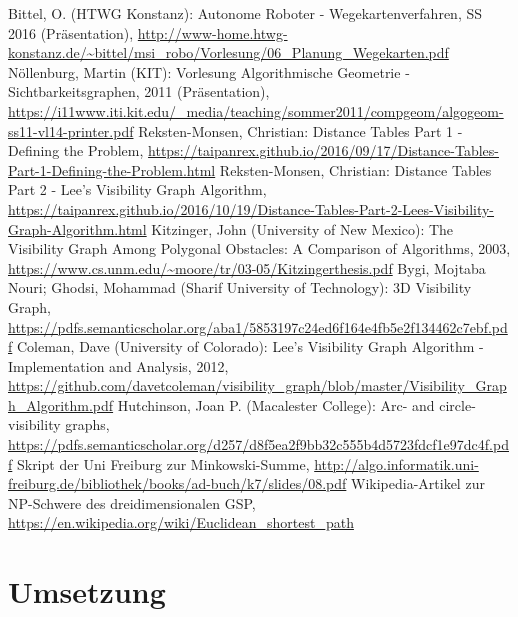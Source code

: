 \documentclass[a4paper, notitlepage, 12pt]{scrartcl}
\begin{document}
\begin{thebibliography}{xx}
 Bittel, O. (HTWG Konstanz): Autonome Roboter - Wegekartenverfahren, SS 2016 (Präsentation), \url{http://www-home.htwg-konstanz.de/~bittel/msi_robo/Vorlesung/06_Planung_Wegekarten.pdf}
 Nöllenburg, Martin (KIT): Vorlesung Algorithmische Geometrie - Sichtbarkeitsgraphen, 2011 (Präsentation), \url{https://i11www.iti.kit.edu/_media/teaching/sommer2011/compgeom/algogeom-ss11-vl14-printer.pdf}
 Reksten-Monsen, Christian: Distance Tables Part 1 - Defining the Problem, \url{https://taipanrex.github.io/2016/09/17/Distance-Tables-Part-1-Defining-the-Problem.html}
 Reksten-Monsen, Christian: Distance Tables Part 2 - Lee's Visibility Graph Algorithm, \url{https://taipanrex.github.io/2016/10/19/Distance-Tables-Part-2-Lees-Visibility-Graph-Algorithm.html}
 Kitzinger, John (University of New Mexico): The Visibility Graph Among Polygonal Obstacles: A Comparison of Algorithms, 2003, \url{https://www.cs.unm.edu/~moore/tr/03-05/Kitzingerthesis.pdf}
 Bygi, Mojtaba Nouri; Ghodsi, Mohammad (Sharif University of Technology): 3D Visibility Graph, \url{https://pdfs.semanticscholar.org/aba1/5853197c24ed6f164e4fb5e2f134462c7ebf.pdf}
 Coleman, Dave (University of Colorado): Lee's Visibility Graph Algorithm - Implementation and Analysis, 2012, \url{https://github.com/davetcoleman/visibility_graph/blob/master/Visibility_Graph_Algorithm.pdf}
 Hutchinson, Joan P. (Macalester College): Arc- and circle-visibility graphs, \url{https://pdfs.semanticscholar.org/d257/d8f5ea2f9bb32c555b4d5723fdcf1e97dc4f.pdf}
 Skript der Uni Freiburg zur Minkowski-Summe, \url{http://algo.informatik.uni-freiburg.de/bibliothek/books/ad-buch/k7/slides/08.pdf}
 Wikipedia-Artikel zur NP-Schwere des dreidimensionalen GSP, \url{https://en.wikipedia.org/wiki/Euclidean_shortest_path}
\end{thebibliography}

\section{Umsetzung}
\end{document}
